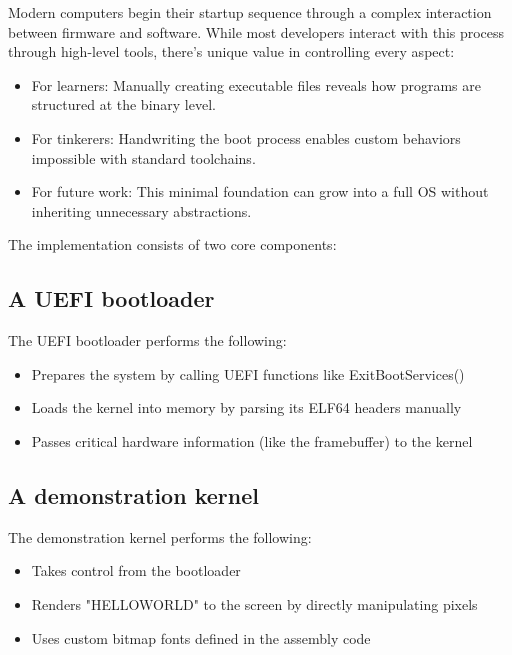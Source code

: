 \documentclass[conference]{IEEEtran}
\begin{document}
Modern computers begin their startup sequence through a complex interaction between firmware and software. While most developers interact with this process through high-level tools, there's unique value in controlling every aspect:

\begin{itemize}
\item For learners: Manually creating executable files reveals how programs are structured at the binary level.

\item For tinkerers: Handwriting the boot process enables custom behaviors impossible with standard toolchains.

\item For future work: This minimal foundation can grow into a full OS without inheriting unnecessary abstractions.
\end{itemize}

The implementation consists of two core components:

\subsection{A UEFI bootloader}

The UEFI bootloader performs the following:

\begin{itemize}
    \item Prepares the system by calling UEFI functions like ExitBootServices()

    \item Loads the kernel into memory by parsing its ELF64 headers manually

    \item Passes critical hardware information (like the framebuffer) to the kernel
\end{itemize}

\subsection{A demonstration kernel}

The demonstration kernel performs the following:

\begin{itemize}

    \item Takes control from the bootloader

    \item Renders "HELLOWORLD" to the screen by directly manipulating pixels

    \item Uses custom bitmap fonts defined in the assembly code
\end{itemize}
\end{document}
